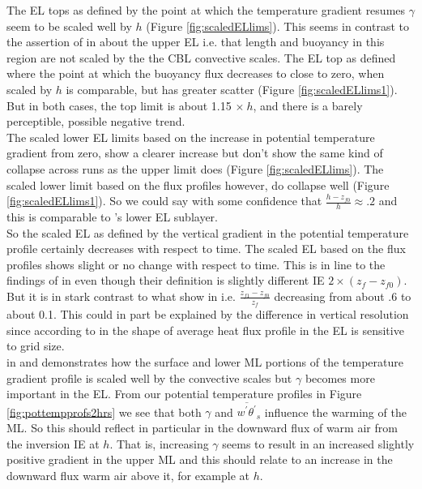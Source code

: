 The \acs{EL} tops as defined by the point at which the temperature gradient resumes $\gamma$ seem to be scaled well by $h$ (Figure \ref{fig:scaledELlims}).  This seems in contrast to the assertion of \citeauthor{GarciaMellado} in \cite{GarciaMellado} about the upper \acs{EL} i.e. that length and buoyancy in this region are not scaled by the the \acs{CBL} convective scales. The \acs{EL} top as defined where the point at which the buoyancy flux decreases to close to zero, when scaled by $h$ is comparable, but has greater scatter (Figure \ref{fig:scaledELlims1}). But in both cases, the top limit is about 1.15 $\times \ h$, and there is a barely perceptible, possible negative trend.\\  

The scaled lower \acs{EL} limits based on the increase in potential temperature gradient from zero, show a clearer increase but don't show the same kind of collapse across runs as the upper limit does (Figure \ref{fig:scaledELlims}).  The scaled lower limit based on the flux profiles however, do collapse well (Figure \ref{fig:scaledELlims1}).  So we could say with some confidence that $\frac{h-z_{f0}}{h} \approx .2$ and this is comparable to \citeauthor{GarciaMellado}'s lower \acs{EL} sublayer.\\
  
So the scaled \acs{EL} as defined by the vertical gradient in the potential temperature profile certainly decreases with respect to time.  The scaled \acs{EL} based on the flux profiles shows slight or no change with respect to time.  This is in line to the findings of \citeauthor{BrooksFowler2} in \cite{BrooksFowler2} even though their definition is slightly different IE $2 \times (z_{f}-z_{f0})$.  But it is in stark contrast to what \citeauthor{FedConzMir04} show in \cite{FedConzMir04} i.e. $\frac{z_{f1}-z_{f0}}{z_{f}}$ decreasing from about .6 to about 0.1.  This could in part be explained by the difference in vertical resolution since according to \citeauthor{SullPat} in \cite{SullPat} the shape of average heat flux profile in the \acs{EL} is sensitive to grid size.\\

\citeauthor{Sorbjan} in \cite{Sorbjan} and \cite{Sorbjan1} demonstrates how the surface and lower \acs{ML} portions of the temperature gradient profile is scaled well by the convective scales but $\gamma$ becomes more important in the \acs{EL}.  From our potential temperature profiles in Figure \ref{fig:pottempprofs2hrs} we see that both $\gamma$ and $\overline{w^{'}\theta^{'}}_{s}$ influence the warming of the \acs{ML}. So this should reflect in particular in the downward flux of warm air from the inversion IE at $h$. That is, increasing $\gamma$ seems to result in an increased slightly positive gradient in the upper \acs{ML} and this should relate to an increase in the downward flux warm air above it, for example at $h$.\\

